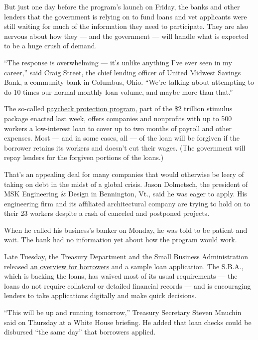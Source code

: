 But just one day before the program's launch on Friday, the banks and
other lenders that the government is relying on to fund loans and vet
applicants were still waiting for much of the information they need to
participate. They are also nervous about how they --- and the government
--- will handle what is expected to be a huge crush of demand.

``The response is overwhelming --- it's unlike anything I've ever seen
in my career,'' said Craig Street, the chief lending officer of United
Midwest Savings Bank, a community bank in Columbus, Ohio. ``We're
talking about attempting to do 10 times our normal monthly loan volume,
and maybe more than that.''

The so-called
\href{https://www.nytimes3xbfgragh.onion/2020/04/20/business/shake-shack-returning-loan-ppp-coronavirus.html}{paycheck
protection program}, part of the \$2 trillion stimulus package enacted
last week, offers companies and nonprofits with up to 500 workers a
low-interest loan to cover up to two months of payroll and other
expenses. Most --- and in some cases, all --- of the loan will be
forgiven if the borrower retains its workers and doesn't cut their
wages. (The government will repay lenders for the forgiven portions of
the loans.)

That's an appealing deal for many companies that would otherwise be
leery of taking on debt in the midst of a global crisis. Jason
Dolmetsch, the president of MSK Engineering \& Design in Bennington,
Vt., said he was eager to apply. His engineering firm and its affiliated
architectural company are trying to hold on to their 23 workers despite
a rash of canceled and postponed projects.

When he called his business's banker on Monday, he was told to be
patient and wait. The bank had no information yet about how the program
would work.

Late Tuesday, the Treasury Department and the Small Business
Administration released
\href{https://www.sba.gov/funding-programs/loans/paycheck-protection-program-ppp}{an
overview for borrowers} and a sample loan application. The S.B.A., which
is backing the loans, has waived most of its usual requirements --- the
loans do not require collateral or detailed financial records --- and is
encouraging lenders to take applications digitally and make quick
decisions.

``This will be up and running tomorrow,'' Treasury Secretary Steven
Mnuchin said on Thursday at a White House briefing. He added that loan
checks could be disbursed ``the same day'' that borrowers applied.

